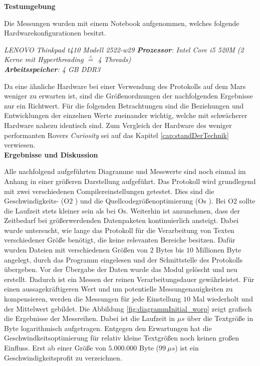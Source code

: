 \textbf{Testumgebung}

Die Messungen wurden mit einem Notebook aufgenommen, welches
folgende Hardwarekonfigurationen besitzt.

\textit{
	LENOVO Thinkpad t410 Modell 2522-w29 \newline
	\textbf{Prozessor}: Intel Core i5 520M (2 Kerne mit Hyperthreading $\stackrel{\wedge}=$ 4 Threads)\\
	\textbf{Arbeitsspeicher}: 4 GB DDR3	
	}

Da eine ähnliche Hardware bei einer Verwendung des Protokolls auf dem Mars
weniger zu erwarten ist, sind die Größenordnungen der nachfolgenden Ergebnisse
nur ein Richtwert. Für die folgenden Betrachtungen sind die Beziehungen und
Entwicklungen der einzelnen Werte zueinander wichtig, welche mit schwächerer
Hardware nahezu identisch sind. Zum Vergleich der Hardware des weniger
performanten Rovers \textit{Curiosity} sei auf das Kapitel
\ref{cap:standDerTechnik} verwiesen.
\\

\textbf{Ergebnisse und Diskussion}

Alle nachfolgend aufgeführten Diagramme und Messwerte sind noch einmal im Anhang
in einer größeren Darstellung aufgeführt.\newline
Das Protokoll wird grundlegend mit zwei verschiedenen Compilereinstellungen
getestet. Dies sind die Geschwindigkeits- (\glqq O$2$ \grqq) und die
Quellcodegrößenoptimierung (\glqq Os \grqq).
\newline
Bei O$2$ sollte die Laufzeit stets kleiner sein als bei Os. Weiterhin ist
anzunehmen, dass der Zeitbedarf bei größerwerdenden Datenpaketen kontinuierlich
ansteigt.
\newline
Dabei wurde untersucht, wie lange das Protokoll für die Verarbeitung von Texten
verschiedener Größe benötigt, die keine relevanten Bereiche besitzen. Dafür
wurden Dateien mit verschiedenen Größen von $2$ Bytes bis $10$ Millionen Byte 
angelegt, durch das Programm eingelesen und der Schnittstelle des Protokolls
übergeben. Vor der Übergabe der Daten wurde das Modul gelöscht und neu erstellt.
Dadurch ist ein Messen der reinen Verarbeitungsdauer gewährleistet. Für einen
aussagekräftigeren Wert und um potentielle Messungenauigkeiten zu kompensieren,
werden die Messungen für jede Einstellung $10$ Mal wiederholt und der Mittelwert
gebildet.
\newline
Die Abbildung \ref{fig:diagrammInitial_worp} zeigt grafisch die Ergebnisse der
Messreihen. Dabei ist die
Laufzeit in $\mu s$ über die Textgröße in Byte logarithmisch aufgetragen.
Entgegen den Erwartungen hat die Geschwindkeitsoptimierung für relativ
kleine Textgrößen noch keinen großen Einfluss. Erst ab einer Größe von
$5.000.000$ Byte ($99\ \mu s$) ist ein Geschwindigkeitsprofit zu
verzeichnen.

